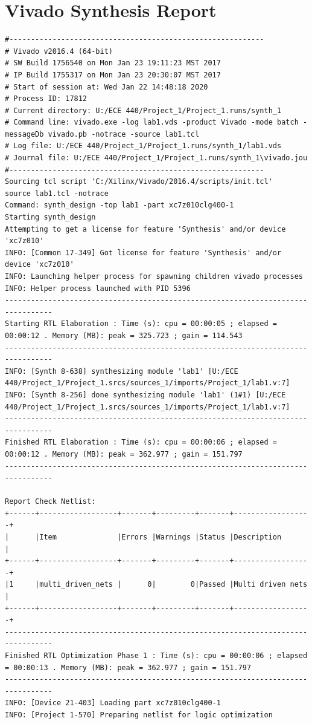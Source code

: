 \documentclass[a4paper, 12pt]{article}
\begin{document}
\section{Vivado Synthesis Report}
\begin{verbatim}#-----------------------------------------------------------
# Vivado v2016.4 (64-bit)
# SW Build 1756540 on Mon Jan 23 19:11:23 MST 2017
# IP Build 1755317 on Mon Jan 23 20:30:07 MST 2017
# Start of session at: Wed Jan 22 14:48:18 2020
# Process ID: 17812
# Current directory: U:/ECE 440/Project_1/Project_1.runs/synth_1
# Command line: vivado.exe -log lab1.vds -product Vivado -mode batch -messageDb vivado.pb -notrace -source lab1.tcl
# Log file: U:/ECE 440/Project_1/Project_1.runs/synth_1/lab1.vds
# Journal file: U:/ECE 440/Project_1/Project_1.runs/synth_1\vivado.jou
#-----------------------------------------------------------
Sourcing tcl script 'C:/Xilinx/Vivado/2016.4/scripts/init.tcl'
source lab1.tcl -notrace
Command: synth_design -top lab1 -part xc7z010clg400-1
Starting synth_design
Attempting to get a license for feature 'Synthesis' and/or device 'xc7z010'
INFO: [Common 17-349] Got license for feature 'Synthesis' and/or device 'xc7z010'
INFO: Launching helper process for spawning children vivado processes
INFO: Helper process launched with PID 5396 
---------------------------------------------------------------------------------
Starting RTL Elaboration : Time (s): cpu = 00:00:05 ; elapsed = 00:00:12 . Memory (MB): peak = 325.723 ; gain = 114.543
---------------------------------------------------------------------------------
INFO: [Synth 8-638] synthesizing module 'lab1' [U:/ECE 440/Project_1/Project_1.srcs/sources_1/imports/Project_1/lab1.v:7]
INFO: [Synth 8-256] done synthesizing module 'lab1' (1#1) [U:/ECE 440/Project_1/Project_1.srcs/sources_1/imports/Project_1/lab1.v:7]
---------------------------------------------------------------------------------
Finished RTL Elaboration : Time (s): cpu = 00:00:06 ; elapsed = 00:00:12 . Memory (MB): peak = 362.977 ; gain = 151.797
---------------------------------------------------------------------------------

Report Check Netlist: 
+------+------------------+-------+---------+-------+------------------+
|      |Item              |Errors |Warnings |Status |Description       |
+------+------------------+-------+---------+-------+------------------+
|1     |multi_driven_nets |      0|        0|Passed |Multi driven nets |
+------+------------------+-------+---------+-------+------------------+
---------------------------------------------------------------------------------
Finished RTL Optimization Phase 1 : Time (s): cpu = 00:00:06 ; elapsed = 00:00:13 . Memory (MB): peak = 362.977 ; gain = 151.797
---------------------------------------------------------------------------------
INFO: [Device 21-403] Loading part xc7z010clg400-1
INFO: [Project 1-570] Preparing netlist for logic optimization


\end{verbatim}
\end{document}
